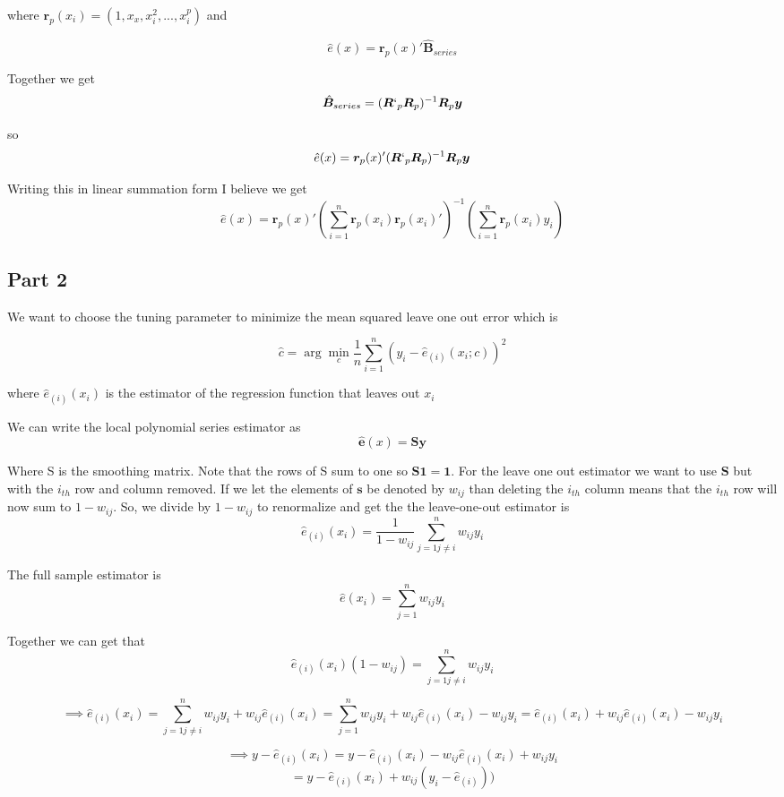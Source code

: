 \documentclass[11pt]{article}
\begin{document}
where $ \bm{r}_p(x_i) = (1,x_x,x_i^2, ..., x_i^p)$ and 

$$\hat{e}(x) = \bm{r}_p(x)'\hat{\bm{B}}_{series}$$

Together we get 
$$ \hat{\bm{B}}_{series} = (\bm{R}`_p \bm{R}_p)^{-1}\bm{R}_p\bm{y}
$$

so 
$$\hat{e}(x) = \bm{r}_p(x)'(\bm{R}`_p \bm{R}_p)^{-1}\bm{R}_p\bm{y}$$

Writing this in linear summation form I believe we get 
$$\hat{e}(x) =  \bm{r}_p(x)' \left( \sum_{i=1}^{n}\bm{r}_p(x_i)\bm{r}_p(x_i)'\right)^{-1} \left( \sum_{i=1}^{n} \bm{r}_p(x_i)y_i \right)$$

\subsection{Part 2}
We want to choose the tuning parameter to minimize the mean squared leave one out error which is 

$$\hat{c} = \arg \min_{c} \frac{1}{n} \sum_{i=1}^{n}(y_i - \hat{e}_(i)(x_i;c))^2$$

where $\hat{e}_{(i)}(x_i)$ is the estimator of the regression function that leaves out $x_i$

We can write the local polynomial series estimator as 
$$ \hat{\bm{e}}(x) = \bm{Sy}$$

Where S is the smoothing matrix. Note that the rows of S sum to one so $\bm{S1 = 1}$. For the leave one out estimator we want to use $\bm{S}$ but with the $i_{th}$ row and column removed. If we let the elements of $\bm{s}$ be denoted by $w_{ij}$ than deleting the $i_{th}$ column means that the $i_{th}$ row will now sum to $1-w_{ij}$. So, we divide by $1-w_{ij}$ to renormalize and get the the leave-one-out estimator is 
$$\hat{e}_{(i)}(x_i) = \frac{1}{1-w_{ij}} \sum_{j=1 j\ne i}^{n} w_{ij} y_i$$

The full sample estimator is 
$$\hat{e}(x_i) = \sum_{j=1}^{n}w_{ij}y_i$$

Together we can get that 
$$\hat{e}_{(i)}(x_i)(1-w_{ij}) =  \sum_{j=1 j\ne i}^{n} w_{ij} y_i
$$

$$\implies \hat{e}_{(i)}(x_i)=  \sum_{j=1 j\ne i}^{n} w_{ij} y_i + w_{ij}\hat{e}_{(i)}(x_i) = \sum_{j=1}^{n} w_{ij} y_i + w_{ij}\hat{e}_{(i)}(x_i)-w_{ij}y_i = \hat{e}_{(i)}(x_i) + w_{ij}\hat{e}_{(i)}(x_i)-w_{ij}y_i$$

$$ \implies y - \hat{e}_{(i)}(x_i) = y - \hat{e}_{(i)}(x_i) - w_{ij}\hat{e}_{(i)}(x_i)+w_{ij}y_i$$
$$ = y- \hat{e}_{(i)}(x_i) + w_{ij}(y_{i} - \hat{e}_{(i)}))
$$ 
\end{document}

